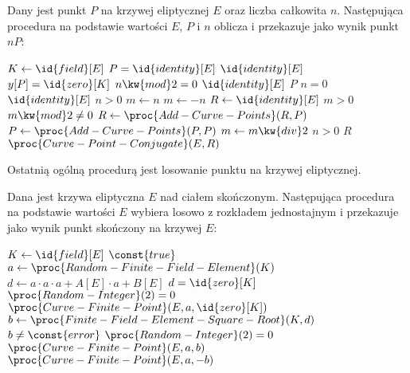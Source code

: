 \begin{algorithm}
Dany jest punkt $P$ na krzywej eliptycznej $E$ oraz liczba całkowita $n$.
Następująca procedura
na podstawie wartości $E$, $P$ i $n$
oblicza i przekazuje jako wynik
punkt $nP$:

\begin{codebox}
\li $K \gets \id{field}[E]$
\li \If $P = \id{identity}[E]$
\li     \Then
            \Return $\id{identity}[E]$
        \End
\li \If $y[P] = \id{zero}[K]$
\li     \Then
            \If $n \kw{ mod } 2 = 0$
\li             \Then
                    \Return $\id{identity}[E]$
\li             \Else
                    \Return $P$
                \End
        \End
\li \If $n = 0$
\li     \Then
            \Return $\id{identity}[E]$
        \End
\li \If $n > 0$
\li     \Then
            $m \gets n$
\li     \Else
            $m \gets -n$
        \End
\li $R \gets \id{identity}[E]$
\li \While $m > 0$
\li     \Do
            \If $m \kw{ mod } 2 \neq 0$
\li             \Then
                    $R \gets \proc{Add-Curve-Points}(R, P)$
                \End
\li         $P \gets \proc{Add-Curve-Points}(P, P)$
\li         $m \gets m \kw{ div } 2$
        \End
\li \If $n > 0$
\li     \Then
            \Return $R$
\li     \Else
            \Return $\proc{Curve-Point-Conjugate}(E, R)$
        \End
\end{codebox}
\end{algorithm}

\noindent
Ostatnią ogólną procedurą jest losowanie punktu na krzywej eliptycznej.

\begin{algorithm}
Dana jest krzywa eliptyczna $E$ nad ciałem skończonym.
Następująca procedura
na podstawie wartości $E$
wybiera losowo z rozkładem jednostajnym i przekazuje jako wynik
punkt skończony na krzywej $E$:

\begin{codebox}
\li $K \gets \id{field}[E]$
\li \While $\const{true}$
\li     \Do
            $a \gets \proc{Random-Finite-Field-Element}(K)$
\li         $d \gets a \cdot a \cdot a + A[E] \cdot a + B[E]$
\li         \If $d = \id{zero}[K]$
\li             \Then
                    \If $\proc{Random-Integer}(2) = 0$
\li                     \Then
                            \Return $\proc{Curve-Finite-Point}(E, a, \id{zero}[K])$
                        \End
\li             \Else
                    $b \gets \proc{Finite-Field-Element-Square-Root}(K, d)$
\li                 \If $b \neq \const{error}$
\li                     \Then
                            \If $\proc{Random-Integer}(2) = 0$
\li                             \Then
                                    \Return $\proc{Curve-Finite-Point}(E, a, b)$
\li                             \Else
                                        \Return $\proc{Curve-Finite-Point}(E, a, -b)$
                                \End
                        \End
                \End
        \End
\end{codebox}
\end{algorithm}

